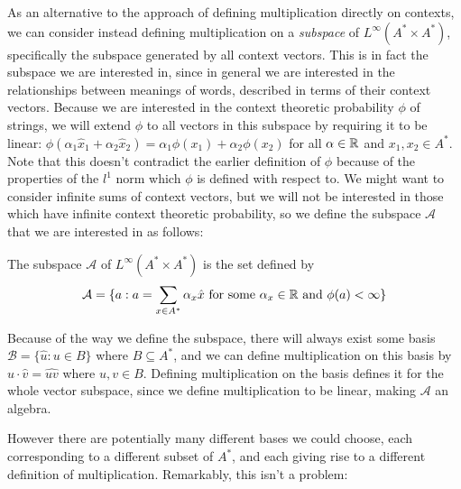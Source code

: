 \documentclass[11pt]{report}
\begin{document}
As an alternative to the approach of defining multiplication directly on contexts, we can consider instead defining multiplication on a \emph{subspace} of $L^\infty(A^*\times A^*)$, specifically the subspace generated by all context vectors. This is in fact the subspace we are interested in, since in general we are interested in the relationships between meanings of words, described in terms of their context vectors. Because we are interested in the context theoretic probability $\phi$ of strings, we will extend $\phi$ to all vectors in this subspace by requiring it to be linear: $\phi(\alpha_1 \hat{x}_1 + \alpha_2\hat{x}_2) = \alpha_1\phi(x_1) + \alpha_2\phi(x_2)$ for all $\alpha \in \mathbb{R}$ and $x_1, x_2 \in A^*$. Note that this doesn't contradict the earlier definition of $\phi$ because of the properties of the $l^1$ norm which $\phi$ is defined with respect to. We might want to consider infinite sums of context vectors, but we will not be interested in those which have infinite context theoretic probability, so we define the subspace $\mathcal{A}$ that we are interested in as follows:
\begin{defn}
The subspace $\mathcal{A}$ of $L^\infty(A^*\times A^*)$ is the set defined by
$$\mathcal{A} = \{a : a = \sum_{x\in A^*}\alpha_x \hat{x}\text{ for some }\alpha_x \in \mathbb{R}\text{ and }\phi(a) < \infty\}$$
\end{defn}


Because of the way we define the subspace, there will always exist some basis $\mathcal{B} = \{\hat{u} : u \in B\}$ where $B \subseteq A^*$, and we can define multiplication on this basis by $\hat{u}\cdot\hat{v} = \widehat{uv}$ where $u,v \in B$. Defining multiplication on the basis defines it for the whole vector subspace, since we define multiplication to be linear, making $\mathcal{A}$ an algebra.

However there are potentially many different bases we could choose, each corresponding to a different subset of $A^*$, and each giving rise to a different definition of multiplication. Remarkably, this isn't a problem:
\end{document}
